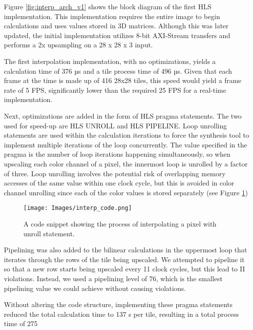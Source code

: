 \documentclass{article}
\begin{document}
                \par Figure \ref{fig:interp_arch_v1} shows the block diagram of the first HLS implementation. This implementation requires the entire image to begin calculations and uses values stored in 3D matrices. Although this was later updated, the initial implementation utilizes 8-bit AXI-Stream transfers and performs a 2x upsampling on a 28 x 28 x 3 input. 
                \par The first interpolation implementation, with no optimizations, yields a calculation time of 376 µs and a tile process time of 496 µs. Given that each frame at the time is made up of 416 28x28 tiles, this speed would yield a frame rate of 5 FPS, significantly lower than the required 25 FPS for a real-time implementation. 

                \par Next, optimizations are added in the form of HLS pragma statements. The two used for speed-up are HLS UNROLL and HLS PIPELINE. Loop unrolling statements are used within the calculation iterations to force the synthesis tool to implement multiple iterations of the loop concurrently. The value specified in the pragma is the number of loop iterations happening simultaneously, so when upscaling each color channel of a pixel, the innermost loop is unrolled by a factor of three. Loop unrolling involves the potential risk of overlapping memory accesses of the same value within one clock cycle, but this is avoided in color channel unrolling since each of the color values is stored separately (see Figure \ref{fig:bilin_code})
                \begin{figure}[!tb] 
                    \centering
                    \texttt{[image: Images/interp\_code.png]} 
                    \caption{A code snippet showing the process of interpolating a pixel with unroll statement.}
                    \label{fig:bilin_code} 
                \end{figure}
                \par Pipelining was also added to the bilinear calculations in the uppermost loop that iterates through the rows of the tile being upscaled. We attempted to pipeline it so that a new row starts being upscaled every 11 clock cycles, but this lead to II violations. Instead, we used a pipelining level of 76, which is the smallest pipelining value we could achieve without causing violations.
                \par Without altering the code structure, implementing these pragma statements reduced the total calculation time to 137 \textmu s per tile, resulting in a total process time of 275 
\end{document}
